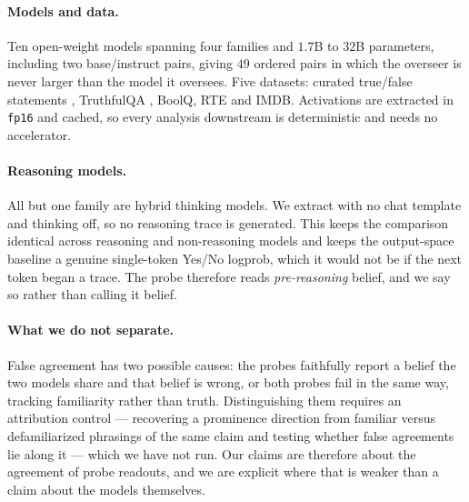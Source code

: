 \paragraph{Models and data.}
Ten open-weight models spanning four families and $1.7$B to $32$B parameters,
including two base/instruct pairs, giving $49$ ordered pairs in which the overseer
is never larger than the model it oversees. Five datasets: curated true/false
statements \citep{marks2024geometry}, TruthfulQA
\citep{lin2022truthfulqa}, BoolQ, RTE and IMDB. Activations are extracted in
\texttt{fp16} and cached, so every analysis downstream is deterministic and needs
no accelerator.

\paragraph{Reasoning models.}
All but one family are hybrid thinking models. We extract with no chat template
and thinking off, so no reasoning trace is generated. This keeps the comparison
identical across reasoning and non-reasoning models and keeps the output-space
baseline a genuine single-token Yes/No logprob, which it would not be if the next
token began a trace. The probe therefore reads \emph{pre-reasoning} belief, and we
say so rather than calling it belief.

\paragraph{What we do not separate.}
False agreement has two possible causes: the probes faithfully report a belief the
two models share and that belief is wrong, or both probes fail in the same way,
tracking familiarity rather than truth. Distinguishing them requires an
attribution control --- recovering a prominence direction from familiar versus
defamiliarized phrasings of the same claim and testing whether false agreements lie
along it --- which we have not run. Our claims are therefore about the agreement of
probe readouts, and we are explicit where that is weaker than a claim about the
models themselves.
